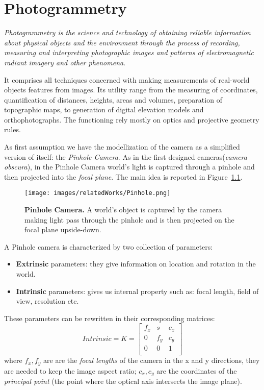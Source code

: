 \chapter{Photogrammetry}
\textit{Photogrammetry is the science and technology of 
obtaining reliable information about physical objects and
the environment through the process of recording,
measuring and interpreting photographic images and patterns 
of electromagnetic radiant imagery and other 
phenomena}\cite{examplewebsite}.

It comprises all techniques concerned with making measurements of
real-world objects features from images.
Its utility range from the measuring of coordinates, quantification
of distances, heights, areas and volumes, preparation
of topographic maps, to generation of digital elevation 
models and orthophotographs. The functioning rely mostly on optics and projective geometry rules. 

\vspace{12pt}

As first assumption we have the modellization of the camera as a simplified
version of itself: the \textit{Pinhole Camera}. As in the first designed
cameras(\textit{camera obscura}), in the Pinhole Camera world's light is 
captured through a pinhole and then projected into the \textit{focal plane}.
The main idea is reported in Figure~\ref{fig:pinhole}.

\begin{figure}
    \centering
    \texttt{[image: images/relatedWorks/Pinhole.png]} %
    \caption{\textbf{Pinhole Camera.} A world's object is captured by the camera making light pass through 
    the pinhole and is then projected on the focal plane upside-down.}
    \label{fig:pinhole}
  \end{figure}
  
A Pinhole camera is characterized by two collection of parameters:
\begin{itemize}
    \item  \textbf{Extrinsic} parameters: they give information on location
                                        and rotation in the world.
    \item  \textbf{Intrinsic} parameters: gives us internal property such as:
                                    focal length, field of view, resolution etc.
\end{itemize}  
These parameters can be rewritten in their corresponding matrices:
\[
  Intrinsic=K= \begin{bmatrix}
    f_{x} & s & c_{x} \\
    0 & f_{y} & c_{y} \\
    0 & 0     & 1     \\
  \end{bmatrix}
\]
where $f_{x},f_{y}$ are are the \textit{focal lengths} of the camera in the x and y directions, 
  they are needed to keep the image aspect ratio;
  $c_{x},c_{y}$ are the coordinates of the \textit{principal point}
  (the point where the optical axis intersects the image plane).

